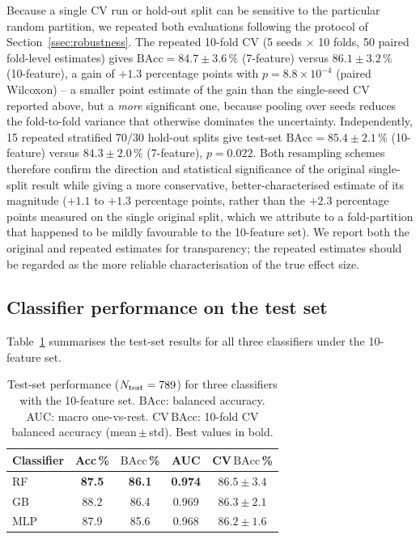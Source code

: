 \documentclass[fleqn,12pt]{article}
\newcommand{\BAcc}{\mathrm{BAcc}}
\begin{document}
Because a single CV run or hold-out split can be sensitive to the
particular random partition, we repeated both evaluations following
the protocol of Section~\ref{ssec:robustness}. The repeated 10-fold CV
(5 seeds $\times$ 10 folds, 50 paired fold-level estimates) gives
$\BAcc = 84.7\pm3.6\,\%$ (7-feature) versus $86.1\pm3.2\,\%$
(10-feature), a gain of $+1.3$ percentage points with
$p = 8.8\times10^{-4}$ (paired Wilcoxon) -- a smaller point estimate of
the gain than the single-seed CV reported above, but a \emph{more}
significant one, because pooling over seeds reduces the fold-to-fold
variance that otherwise dominates the uncertainty. Independently, 15
repeated stratified 70/30 hold-out splits give test-set
$\BAcc = 85.4\pm2.1\,\%$ (10-feature) versus $84.3\pm2.0\,\%$
(7-feature), $p = 0.022$. Both resampling schemes therefore confirm
the direction and statistical significance of the original single-split
result while giving a more conservative, better-characterised estimate
of its magnitude ($+1.1$ to $+1.3$ percentage points, rather than the
$+2.3$ percentage points measured on the single original split, which
we attribute to a fold-partition that happened to be mildly favourable
to the 10-feature set). We report both the original and repeated
estimates for transparency; the repeated estimates should be regarded
as the more reliable characterisation of the true effect size.

\subsection{Classifier performance on the test set}
\label{sec:results_clf}

Table~\ref{tab:supervised} summarises the test-set results for all
three classifiers under the 10-feature set.

\begin{table}
\caption{Test-set performance ($N_{\rm test} = 789$) for three
  classifiers with the 10-feature set. $\BAcc$: balanced accuracy.
  AUC: macro one-vs-rest. CV\,$\BAcc$: 10-fold CV balanced accuracy
  (mean\,$\pm$\,std). Best values in bold.}
\label{tab:supervised}
\begin{tabular}{lcccc}
\hline
Classifier & Acc\,\% & $\BAcc$\,\% & AUC & CV\,$\BAcc$\,\% \\
\hline
RF  & \textbf{87.5} & \textbf{86.1} & \textbf{0.974} & $86.5\pm3.4$ \\
GB  & 88.2 & 86.4 & 0.969 & $86.3\pm2.1$ \\
MLP & 87.9 & 85.6 & 0.968 & $86.2\pm1.6$ \\
\hline
\end{tabular}
\end{table}
\end{document}
